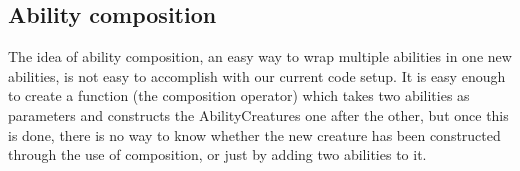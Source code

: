 \subsection{Ability composition}
The idea of ability composition, an easy way to wrap multiple abilities in one new abilities, is not easy to accomplish with our current code setup. It is easy enough to create a function (the composition operator) which takes two abilities as parameters and constructs the AbilityCreatures one after the other, but once this is done, there is no way to know whether the new creature has been constructed through the use of composition, or just by adding two abilities to it.